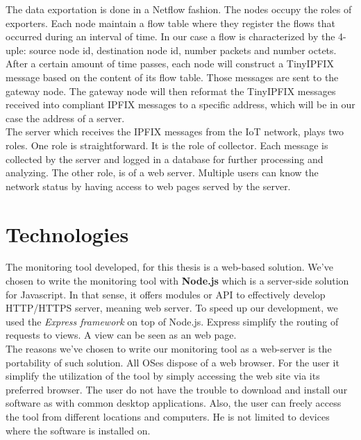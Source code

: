 The data exportation is done in a Netflow fashion. The nodes occupy the roles of exporters. Each node maintain a flow table where they register the flows that occurred during an interval of time. In our case a flow is characterized by the 4-uple: source node id, destination node id, number packets and number octets. After a certain amount of time passes, each node will construct a TinyIPFIX message based on the content of its flow table. Those messages are sent to the gateway node. The gateway node will then reformat the TinyIPFIX messages received into compliant IPFIX messages to a specific address, which will be in our case the address of a server.\\

The server which receives the IPFIX messages from the IoT network, plays two roles. One role is straightforward. It is the role of collector. Each message is collected by the server and logged in a database for further processing and analyzing. The other role, is of a web server. Multiple users can know the network status by having access to web pages served by the server.

\section{Technologies}

The monitoring tool developed, for this thesis is a web-based solution. We've chosen to write the monitoring tool with \textbf{Node.js} \cite{website:nodejs} which is a server-side solution for Javascript. In that sense, it offers modules or API to effectively develop HTTP/HTTPS server, meaning web server. To speed up our development, we used the \textit{Express framework} \cite{website:express} on top of Node.js. Express simplify the routing of requests to views. A view can be seen as an web page. \\

The reasons we've chosen to write our monitoring tool as a web-server is the portability of such solution. All OSes dispose of a web browser. For the user it simplify the utilization of the tool by simply accessing the web site via its preferred browser. The user do not have the trouble to download and install our software as with common desktop applications. Also, the user can freely access the tool from different locations and computers. He is not limited to devices where the software is installed on. \\

